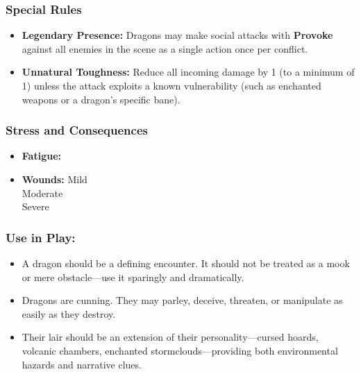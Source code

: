 \subsubsection*{Special Rules}
\begin{itemize}
  \item \textbf{Legendary Presence:} Dragons may make social attacks with \textbf{Provoke} against all enemies in the scene as a single action once per conflict.
  \item \textbf{Unnatural Toughness:} Reduce all incoming damage by 1 (to a minimum of 1) unless the attack exploits a known vulnerability (such as enchanted weapons or a dragon’s specific bane).
\end{itemize}

\subsubsection*{Stress and Consequences}
\begin{itemize}
  \item \textbf{Fatigue:} 
  \FatigueBox\FatigueBox\FatigueBox\FatigueBox\FatigueBox
  \FatigueBox\FatigueBox\FatigueBox\FatigueBox\FatigueBox 
  \item \textbf{Wounds:} 
  Mild \MildWound\MildWound\MildWound\MildWound
       \MildWound\MildWound\MildWound\MildWound \\
  Moderate \ModerateWound\ModerateWound\ModerateWound\ModerateWound \\
  Severe \SevereWound\SevereWound\SevereWound\SevereWound 
\end{itemize}

\subsubsection*{Use in Play:}
\begin{itemize}
  \item A dragon should be a defining encounter. It should not be treated as a mook or mere obstacle—use it sparingly and dramatically.
  \item Dragons are cunning. They may parley, deceive, threaten, or manipulate as easily as they destroy.
  \item Their lair should be an extension of their personality—cursed hoards, volcanic chambers, enchanted stormclouds—providing both environmental hazards and narrative clues.
\end{itemize}